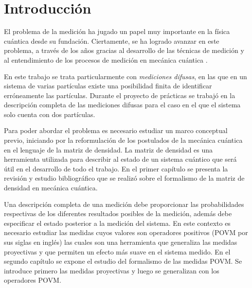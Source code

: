 \chapter*{Introducción}

El problema de la medición ha jugado un papel muy importante en la física
cuántica desde su fundación. Ciertamente, se ha logrado avanzar en este
problema, a través de los años gracias al desarrollo de las técnicas de
medición y al entendimiento de los procesos de medición en mecánica cuántica
{\cite{Pineda_2021}}. 

En este trabajo se trata particularmente con \textit{mediciones difusas}, en las
que en un sistema de varias partículas existe una posibilidad finita de
identificar erróneamente las partículas. Durante el proyecto de prácticas se
trabajó en la descripción completa de las mediciones difusas para el caso en el
que el sistema solo cuenta con dos partículas.

Para poder abordar el problema es necesario estudiar un marco conceptual previo, iniciando por la reformulación de los postulados de la mecánica cuántica en el lenguaje de la matriz de densidad. La matriz de densidad es una herramienta utilizada para describir al estado de un sistema cuántico que será útil en el desarrollo de todo el trabajo. En el primer capítulo  se presenta la revisión y estudio bibliográfico que se realizó sobre el formalismo de la matriz de densidad en mecánica cuántica. 

Una descripción completa de una medición debe proporcionar las probabilidades
respectivas de los diferentes resultados posibles de la medición, además debe  especificar el estado posterior a la medición del sistema. %
En este contexto es necesario estudiar las medidas cuyos valores son operadores positivos (POVM por sus siglas en inglés) las cuales son una herramienta que generaliza las medidas proyectivas y que permiten un efecto más suave en el sistema medido. En el segundo capítulo se expone el estudio del formalismo de las medidas POVM\@. Se introduce primero las medidas proyectivas y luego se generalizan con los operadores POVM\@. %


